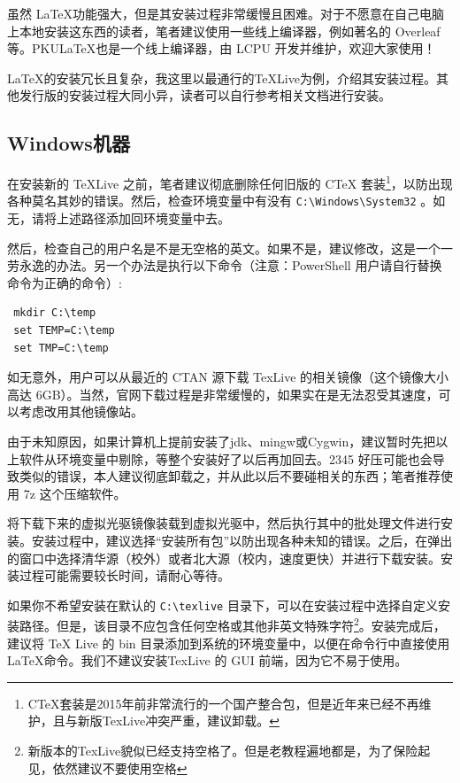 虽然 \LaTeX 功能强大，但是其安装过程非常缓慢且困难。对于不愿意在自己电脑上本地安装这东西的读者，笔者建议使用一些线上编译器，例如著名的 Overleaf 等。PKU\LaTeX 也是一个线上编译器，由 LCPU 开发并维护，欢迎大家使用！

LaTeX的安装冗长且复杂，我这里以最通行的\TeX Live为例，介绍其安装过程。其他发行版的安装过程大同小异，读者可以自行参考相关文档进行安装。

\subsection{Windows机器}

在安装新的 \TeX Live 之前，笔者建议彻底删除任何旧版的 CTeX 套装\footnote{CTeX套装是2015年前非常流行的一个国产整合包，但是近年来已经不再维护，且与新版TexLive冲突严重，建议卸载。}，以防出现各种莫名其妙的错误。然后，检查环境变量中有没有 \verb|C:\Windows\System32| 。如无，请将上述路径添加回环境变量中去。

然后，检查自己的用户名是不是无空格的英文。如果不是，建议修改，这是一个一劳永逸的办法。另一个办法是执行以下命令（注意：PowerShell 用户请自行替换命令为正确的命令）:

\begin{verbatim}
 mkdir C:\temp
 set TEMP=C:\temp
 set TMP=C:\temp
\end{verbatim}

如无意外，用户可以从最近的 CTAN 源下载 TexLive 的相关镜像（这个镜像大小高达 6GB）。当然，官网下载过程是非常缓慢的，如果实在是无法忍受其速度，可以考虑改用其他镜像站。

由于未知原因，如果计算机上提前安装了jdk、mingw或Cygwin，建议暂时先把以上软件从环境变量中剔除，等整个安装好了以后再加回去。2345 好压可能也会导致类似的错误，本人建议彻底卸载之，并从此以后不要碰相关的东西；笔者推荐使用 7z 这个压缩软件。

将下载下来的虚拟光驱镜像装载到虚拟光驱中，然后执行其中的批处理文件进行安装。安装过程中，建议选择“安装所有包”以防出现各种未知的错误。之后，在弹出的窗口中选择清华源（校外）或者北大源（校内，速度更快）并进行下载安装。安装过程可能需要较长时间，请耐心等待。

如果你不希望安装在默认的 \verb|C:\texlive| 目录下，可以在安装过程中选择自定义安装路径。但是，该目录不应包含任何空格或其他非英文特殊字符\footnote{新版本的TexLive貌似已经支持空格了。但是老教程遍地都是，为了保险起见，依然建议不要使用空格}。安装完成后，建议将 TeX Live 的 bin 目录添加到系统的环境变量中，以便在命令行中直接使用 \LaTeX 命令。我们不建议安装TexLive 的 GUI 前端，因为它不易于使用。

